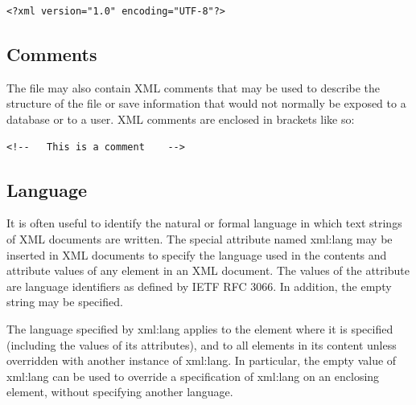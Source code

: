 \lstset{frame=none}
\begin{lstlisting}
<?xml version="1.0" encoding="UTF-8"?>
\end{lstlisting}

\subsection{Comments}
The file may also contain XML comments that may be used to describe the structure of the file or save information that would not normally be exposed to a database or to a user. XML comments are enclosed in brackets like so:

\begin{lstlisting}
<!--   This is a comment    -->
\end{lstlisting}
\lstset{frame=single}

\subsection{Language}
It is often useful to identify the natural or formal language in which text strings of XML documents are written.  The special attribute named xml:lang may be inserted in XML documents to specify the language used in the contents and attribute values of any element in an XML document. The values of the attribute are language identifiers as defined by IETF RFC 3066. In addition, the empty string may be specified.

The language specified by xml:lang applies to the element where it is specified (including the values of its attributes), and to all elements in its content unless overridden with another instance of xml:lang. In particular, the empty value of xml:lang can be used to override a specification of xml:lang on an enclosing element, without specifying another language.

